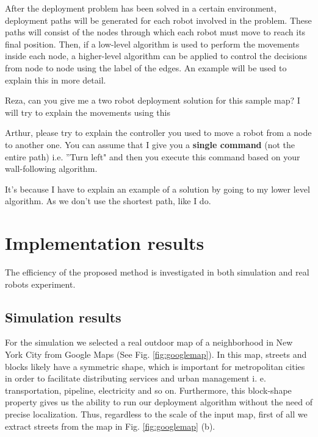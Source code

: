 \documentclass[twocolumn]{svjour3}       %
\begin{document}
After the deployment problem has been solved in a certain environment, deployment paths will be generated for each robot involved in the problem. These paths will consist of the nodes through which each robot must move to reach its final position. Then, if a low-level algorithm is used to perform the movements inside each node, a higher-level algorithm can be applied to control the decisions from node to node using the label of the edges. An example will be used to explain this in more detail.

{\color{green}
Reza, can you give me a two robot deployment solution for this sample map? I will try to explain the movements using this
}

Arthur, please try to explain the controller you used to move a robot from a node to another one. You can assume that I give you a \textbf{single command} (not the entire path) i.e. ''Turn left" and then you execute this command based on your wall-following algorithm.

{\color{yellow}
It's because I have to explain an example of a solution by going to my lower level algorithm. As we don't use the shortest path, like I do.
}

\section{Implementation results}
\label{sec:implementation}

The efficiency of the proposed method is investigated in both simulation and real robots experiment.

\subsection{Simulation results}
%
For the simulation we selected a real outdoor map of a neighborhood in New York City from Google Maps (See Fig. \ref{fig:googlemap}). In this map, streets and blocks likely have a symmetric shape, which is important for metropolitan cities in order to facilitate distributing services and urban management i. e. transportation, pipeline, electricity and so on. Furthermore, this block-shape property gives us the ability to run our deployment algorithm without the need of precise localization. Thus, regardless to the scale of the input map, first of all we extract streets from the map in Fig. \ref{fig:googlemap} (b). 
\end{document}
